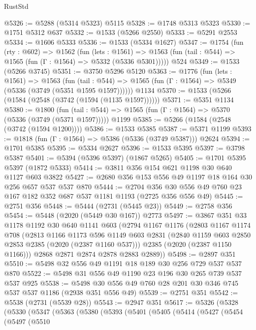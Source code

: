 \begin{lexlean}{RustStd}
\begin{coremodule}
@5326 := @5288 (@5314 @5323) @5115
@5328 := @1748 @5313 @5323
@5330 := @1751 @5312 @637
@5332 := @1533 (@5266 @2550)
@5333 := @5291 @2553
@5334 := @1606 @5333
@5336 := @1533 (@5334 @1627)
@5347 := @1754
    (fun (rty : @602) =>
    @1562
      (fun (lets : @1561) =>
      @1563 (fun (tail : @544) => @1565 (fun (Γ : @1564) => @5332 (@5336 @5301)))))
    @524
@5349 := @1533 (@5266 @3745)
@5351 := @3750 @5296 @5120
@5363 := @1776
    (fun (lets : @1561) =>
    @1563
      (fun (tail : @544) => @1565 (fun (Γ : @1564) => @5349 (@5336 (@3749 (@5351 @1595 @1597))))))
    @1134
@5370 := @1533 (@5266 (@1584 (@2548 (@3742 (@1594 (@1135 @1597))))))
@5371 := @5351 @1134
@5380 := @1800
    (fun (tail : @544) => @1565 (fun (Γ : @1564) => @5370 (@5336 (@3749 (@5371 @1597)))))
    @1199
@5385 := @5266 (@1584 (@2548 (@3742 (@1594 @1200))))
@5386 := @1533 @5385
@5387 := @5371 @1199
@5393 := @1818 (fun (Γ : @1564) => @5386 (@5336 (@3749 @5387))) @2624
@5394 := @1701 @5385
@5395 := @5334 @2627
@5396 := @1533 @5395
@5397 := @3798 @5387
@5401 := @5394 (@5396 @5397) (@1867 @5265)
@5405 := @1701 @5395 @5397 (@1872 @5333)
@5414 := @3811 @356 @154 @621 @1198 @30 @640 @1127 @603 @3822
@5427 := @2680 @356 @153 @556 @49 @1197 @18 @164 @30 @256 @657 @537 @537 @870
@5444 := @2704 @356 @30 @556 @49 @760 @23 @167 @182 @352 @687 @537 @1181 @1193 (@2725 @356 @556 @49)
@5445 := @2751 @356
@5448 := @5444 (@2731 (@5445 @23))
@5449 := @2758 @356
@5454 := @5448 (@2020 (@5449 @30 @167)) @2773
@5497 := @3867
    @351
    @33
    @1178
    @1192
    @30
    @640
    @1141
    @603
    (@2794
      @1167
      @1176
      (@2803
        @1167
        @1174
        @708
        (@2813
          @1166
          @1173
          @596
          @1149
          @603
          @2831
          (@2840 @1159 @603 @2850 @2853 @2385 (@2020 (@2387 @1160 @537)))
          @2385
          (@2020 (@2387 @1150 @1166)))
        @2868
        @2871
        @2874
        @2878
        @2883
        @2889))
@5498 := @2897 @351
@5510 := @5498 @32 @556 @49 @1191 @18 @189 @30 @256 @729 @537 @537 @870
@5522 := @5498 @31 @556 @49 @1190 @23 @196 @30 @265 @739 @537 @537 @925
@5538 := @5498 @30 @556 @49 @760 @28 @201 @30 @346 @745 @537 @537 @1186 (@2938 @351 @556 @49)
@5539 := @2751 @351
@5542 := @5538 (@2731 (@5539 @28))
@5543 := @2947 @351
@5617 := @5326
    (@5328
      (@5330
        (@5347
          (@5363
            (@5380
              (@5393
                (@5401
                  (@5405
                    (@5414
                      (@5427
                        (@5454
                          (@5497
                            (@5510

\end{coremodule}
\end{lexlean}
